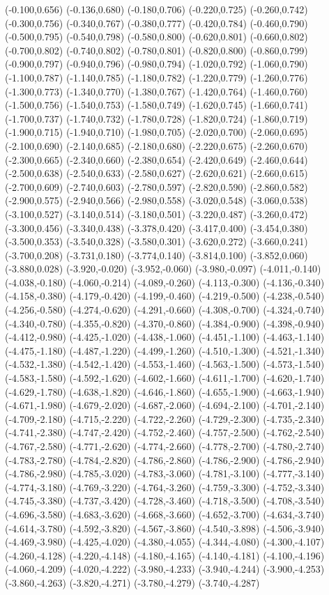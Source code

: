 (-0.100,0.656) (-0.136,0.680) (-0.180,0.706) (-0.220,0.725) (-0.260,0.742) (-0.300,0.756) (-0.340,0.767) (-0.380,0.777) (-0.420,0.784) (-0.460,0.790) (-0.500,0.795) (-0.540,0.798) (-0.580,0.800) (-0.620,0.801) (-0.660,0.802) (-0.700,0.802) (-0.740,0.802) (-0.780,0.801) (-0.820,0.800) (-0.860,0.799) (-0.900,0.797) (-0.940,0.796) (-0.980,0.794) (-1.020,0.792) (-1.060,0.790) (-1.100,0.787) (-1.140,0.785) (-1.180,0.782) (-1.220,0.779) (-1.260,0.776) (-1.300,0.773) (-1.340,0.770) (-1.380,0.767) (-1.420,0.764) (-1.460,0.760) (-1.500,0.756) (-1.540,0.753) (-1.580,0.749) (-1.620,0.745) (-1.660,0.741) (-1.700,0.737) (-1.740,0.732) (-1.780,0.728) (-1.820,0.724) (-1.860,0.719) (-1.900,0.715) (-1.940,0.710) (-1.980,0.705) (-2.020,0.700) (-2.060,0.695) (-2.100,0.690) (-2.140,0.685) (-2.180,0.680) (-2.220,0.675) (-2.260,0.670) (-2.300,0.665) (-2.340,0.660) (-2.380,0.654) (-2.420,0.649) (-2.460,0.644) (-2.500,0.638) (-2.540,0.633) (-2.580,0.627) (-2.620,0.621) (-2.660,0.615) (-2.700,0.609) (-2.740,0.603) (-2.780,0.597) (-2.820,0.590) (-2.860,0.582) (-2.900,0.575) (-2.940,0.566) (-2.980,0.558) (-3.020,0.548) (-3.060,0.538) (-3.100,0.527) (-3.140,0.514) (-3.180,0.501) (-3.220,0.487) (-3.260,0.472) (-3.300,0.456) (-3.340,0.438) (-3.378,0.420) (-3.417,0.400) (-3.454,0.380) (-3.500,0.353) (-3.540,0.328) (-3.580,0.301) (-3.620,0.272) (-3.660,0.241) (-3.700,0.208) (-3.731,0.180) (-3.774,0.140) (-3.814,0.100) (-3.852,0.060) (-3.880,0.028) (-3.920,-0.020) (-3.952,-0.060) (-3.980,-0.097) (-4.011,-0.140) (-4.038,-0.180) (-4.060,-0.214) (-4.089,-0.260) (-4.113,-0.300) (-4.136,-0.340) (-4.158,-0.380) (-4.179,-0.420) (-4.199,-0.460) (-4.219,-0.500) (-4.238,-0.540) (-4.256,-0.580) (-4.274,-0.620) (-4.291,-0.660) (-4.308,-0.700) (-4.324,-0.740) (-4.340,-0.780) (-4.355,-0.820) (-4.370,-0.860) (-4.384,-0.900) (-4.398,-0.940) (-4.412,-0.980) (-4.425,-1.020) (-4.438,-1.060) (-4.451,-1.100) (-4.463,-1.140) (-4.475,-1.180) (-4.487,-1.220) (-4.499,-1.260) (-4.510,-1.300) (-4.521,-1.340) (-4.532,-1.380) (-4.542,-1.420) (-4.553,-1.460) (-4.563,-1.500) (-4.573,-1.540) (-4.583,-1.580) (-4.592,-1.620) (-4.602,-1.660) (-4.611,-1.700) (-4.620,-1.740) (-4.629,-1.780) (-4.638,-1.820) (-4.646,-1.860) (-4.655,-1.900) (-4.663,-1.940) (-4.671,-1.980) (-4.679,-2.020) (-4.687,-2.060) (-4.694,-2.100) (-4.701,-2.140) (-4.709,-2.180) (-4.715,-2.220) (-4.722,-2.260) (-4.729,-2.300) (-4.735,-2.340) (-4.741,-2.380) (-4.747,-2.420) (-4.752,-2.460) (-4.757,-2.500) (-4.762,-2.540) (-4.767,-2.580) (-4.771,-2.620) (-4.774,-2.660) (-4.778,-2.700) (-4.780,-2.740) (-4.783,-2.780) (-4.784,-2.820) (-4.786,-2.860) (-4.786,-2.900) (-4.786,-2.940) (-4.786,-2.980) (-4.785,-3.020) (-4.783,-3.060) (-4.781,-3.100) (-4.777,-3.140) (-4.774,-3.180) (-4.769,-3.220) (-4.764,-3.260) (-4.759,-3.300) (-4.752,-3.340) (-4.745,-3.380) (-4.737,-3.420) (-4.728,-3.460) (-4.718,-3.500) (-4.708,-3.540) (-4.696,-3.580) (-4.683,-3.620) (-4.668,-3.660) (-4.652,-3.700) (-4.634,-3.740) (-4.614,-3.780) (-4.592,-3.820) (-4.567,-3.860) (-4.540,-3.898) (-4.506,-3.940) (-4.469,-3.980) (-4.425,-4.020) (-4.380,-4.055) (-4.344,-4.080) (-4.300,-4.107) (-4.260,-4.128) (-4.220,-4.148) (-4.180,-4.165) (-4.140,-4.181) (-4.100,-4.196) (-4.060,-4.209) (-4.020,-4.222) (-3.980,-4.233) (-3.940,-4.244) (-3.900,-4.253) (-3.860,-4.263) (-3.820,-4.271) (-3.780,-4.279) (-3.740,-4.287) 